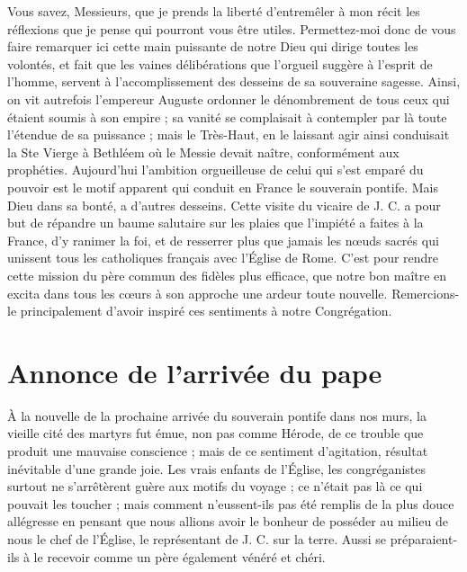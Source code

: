 Vous savez, Messieurs, que je prends la liberté d'entremêler à mon récit les réflexions que je pense qui pourront vous être utiles. Permettez-moi donc de vous faire remarquer ici cette main puissante de notre Dieu qui dirige toutes les volontés, et fait que les vaines délibérations que l'orgueil suggère à l'esprit de l'homme, servent à l'accomplissement des desseins de sa souveraine sagesse. Ainsi, on vit autrefois l'empereur Auguste ordonner le dénombrement de tous ceux qui étaient soumis à son empire ; sa vanité se complaisait à contempler par là toute l'étendue de sa puissance ; mais le Très-Haut, en le laissant agir ainsi conduisait la Ste Vierge à Bethléem où le Messie devait naître, conformément aux prophéties. Aujourd'hui l'ambition orgueilleuse de celui qui s'est emparé du pouvoir est le motif apparent qui conduit en France le souverain pontife. Mais Dieu dans sa bonté, a d'autres desseins. Cette visite du vicaire de J. C. a pour but de répandre un baume salutaire sur les plaies que l'impiété a faites à la France, d'y ranimer la foi, et de resserrer plus que jamais les nœuds sacrés qui unissent tous les catholiques français avec l'Église de Rome. C'est pour rendre cette mission du
père commun des fidèles plus efficace, que notre bon maître en excita dans tous les cœurs à son approche une ardeur toute nouvelle. Remercions-le principalement d'avoir inspiré ces sentiments à notre Congrégation.

\section*{Annonce de l'arrivée du pape}
À la nouvelle de la prochaine arrivée du souverain pontife dans nos murs, la vieille cité des martyrs fut émue, non pas comme Hérode, de ce trouble que produit une mauvaise conscience ; mais de ce sentiment d'agitation, résultat inévitable d'une grande joie. Les vrais enfants de l'Église, les congréganistes surtout ne s'arrêtèrent guère aux motifs du voyage ; ce n'était pas là ce qui pouvait les toucher ; mais comment n'eussent-ils pas été remplis de la plus douce allégresse en pensant que nous allions avoir le bonheur de posséder au milieu de nous le chef de l'Église, le représentant de J. C. sur la terre. Aussi se préparaient-ils à le recevoir comme un père également vénéré et chéri.

